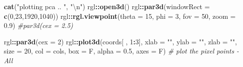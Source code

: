 \documentclass[]{article}
\newenvironment{Shaded}{\begin{snugshade}}{\end{snugshade}}
\newcommand{\KeywordTok}[1]{\textcolor[rgb]{0.13,0.29,0.53}{\textbf{#1}}}
\newcommand{\DataTypeTok}[1]{\textcolor[rgb]{0.13,0.29,0.53}{#1}}
\newcommand{\DecValTok}[1]{\textcolor[rgb]{0.00,0.00,0.81}{#1}}
\newcommand{\FloatTok}[1]{\textcolor[rgb]{0.00,0.00,0.81}{#1}}
\newcommand{\CharTok}[1]{\textcolor[rgb]{0.31,0.60,0.02}{#1}}
\newcommand{\StringTok}[1]{\textcolor[rgb]{0.31,0.60,0.02}{#1}}
\newcommand{\CommentTok}[1]{\textcolor[rgb]{0.56,0.35,0.01}{\textit{#1}}}
\newcommand{\OperatorTok}[1]{\textcolor[rgb]{0.81,0.36,0.00}{\textbf{#1}}}
\newcommand{\NormalTok}[1]{#1}
\begin{document}
\begin{Shaded}
\begin{Highlighting}[]
       \KeywordTok{cat}\NormalTok{(}\StringTok{"plotting pca .. "}\NormalTok{, }\StringTok{"}\CharTok{\textbackslash{}n}\StringTok{"}\NormalTok{)}
\NormalTok{       rgl}\OperatorTok{::}\KeywordTok{open3d}\NormalTok{()}
\NormalTok{       rgl}\OperatorTok{::}\KeywordTok{par3d}\NormalTok{(}\DataTypeTok{windowRect =} \KeywordTok{c}\NormalTok{(}\DecValTok{0}\NormalTok{,}\DecValTok{23}\NormalTok{,}\DecValTok{1920}\NormalTok{,}\DecValTok{1040}\NormalTok{))}
\NormalTok{       rgl}\OperatorTok{::}\KeywordTok{rgl.viewpoint}\NormalTok{(}\DataTypeTok{theta =} \DecValTok{15}\NormalTok{, }\DataTypeTok{phi =} \DecValTok{3}\NormalTok{, }\DataTypeTok{fov =} \DecValTok{50}\NormalTok{, }\DataTypeTok{zoom =} \FloatTok{0.9}\NormalTok{)}
       \CommentTok{#par3d(cex = 2.5)}

\NormalTok{       rgl}\OperatorTok{::}\KeywordTok{par3d}\NormalTok{(}\DataTypeTok{cex =} \DecValTok{2}\NormalTok{)}
\NormalTok{       rgl}\OperatorTok{::}\KeywordTok{plot3d}\NormalTok{(coords[ , }\DecValTok{1}\OperatorTok{:}\DecValTok{3}\NormalTok{], }\DataTypeTok{xlab =} \StringTok{""}\NormalTok{, }\DataTypeTok{ylab =} \StringTok{""}\NormalTok{, }\DataTypeTok{zlab =} \StringTok{""}\NormalTok{, }\DataTypeTok{size =} \DecValTok{20}\NormalTok{, }\DataTypeTok{col =}\NormalTok{ cols, }\DataTypeTok{box =}\NormalTok{ F, }\DataTypeTok{alpha =} \FloatTok{0.5}\NormalTok{, }\DataTypeTok{axes =}\NormalTok{ F)       }\CommentTok{# plot the pixel points - All}


\end{Highlighting}
\end{Shaded}
\end{document}
